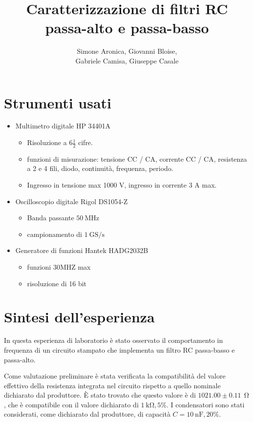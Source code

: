 \documentclass{article}
\title{Caratterizzazione di filtri RC passa-alto e passa-basso}
\author{Simone Aronica, Giovanni Bloise, \\
Gabriele Camisa, Giuseppe Casale}
\begin{document}
\maketitle
\tableofcontents
\pagebreak

\section{Strumenti usati}
\begin{itemize}
    \item Multimetro digitale HP 34401A
    \begin{itemize}
        \item Risoluzione a 6$\frac{1}{2}$ cifre.
        \item funzioni di misurazione: tensione CC / CA, corrente CC / CA, resistenza a 2 e 4 fili, diodo, continuità, frequenza, periodo.
        \item Ingresso in tensione max 1000 V, ingresso in corrente 3 A max.
    \end{itemize}
    \item Oscilloscopio digitale Rigol DS1054-Z
    \begin{itemize}
		\item Banda passante $\SI{50}{\mega\hertz}$
		\item campionamento di $\SI{1}{\giga\siemens\per\second}$
	\end{itemize}
    \item Generatore di funzioni Hantek HADG2032B
    \begin{itemize}
		\item funzioni 30MHZ max 
		\item risoluzione di 16 bit
	\end{itemize}
    
\end{itemize}


\section{Sintesi dell'esperienza}

In questa esperienza di laboratorio è stato osservato il comportamento in frequenza di un circuito stampato che implementa un filtro RC passa-basso e passa-alto.

Come valutazione preliminare è stata verificata la compatibilità del valore effettivo della resistenza integrata nel circuito rispetto a quello nominale dichiarato dal produttore.
È stato trovato che questo valore è di $1021.00\pm0.11\ \SI{}{\ohm}$, che è compatibile con il valore dichiarato di $\SI{1}{\kilo\ohm}, 5\%$.
I condensatori sono stati considerati, come dichiarato dal produttore, di capacità $C=\SI{10}{\nano\farad}, 20\%$.
\end{document}

